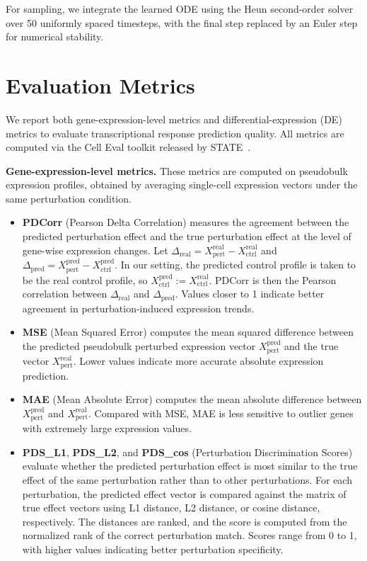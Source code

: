 \documentclass[11pt]{article}
\begin{document}
For sampling, we integrate the learned ODE using the Heun second-order solver over 50 uniformly spaced timesteps, with the final step replaced by an Euler step for numerical stability. 



\section{Evaluation Metrics}
\label{app:evaluation_metrics}

We report both gene-expression-level metrics and differential-expression (DE) metrics to evaluate transcriptional response prediction quality. All metrics are computed via the Cell Eval toolkit released by STATE~\cite{arcinstitute2026celleval}.

\textbf{Gene-expression-level metrics.} These metrics are computed on pseudobulk expression profiles, obtained by averaging single-cell expression vectors under the same perturbation condition.

\begin{itemize}
  \item \textbf{PDCorr} (Pearson Delta Correlation) measures the agreement between the predicted perturbation effect and the true perturbation effect at the level of gene-wise expression changes. Let $\Delta_{\mathrm{real}} = X^{\mathrm{real}}_{\mathrm{pert}} - X^{\mathrm{real}}_{\mathrm{ctrl}}$ and $\Delta_{\mathrm{pred}} = X^{\mathrm{pred}}_{\mathrm{pert}} - X^{\mathrm{pred}}_{\mathrm{ctrl}}$. In our setting, the predicted control profile is taken to be the real control profile, so $X^{\mathrm{pred}}_{\mathrm{ctrl}} := X^{\mathrm{real}}_{\mathrm{ctrl}}$. PDCorr is then the Pearson correlation between $\Delta_{\mathrm{real}}$ and $\Delta_{\mathrm{pred}}$. Values closer to 1 indicate better agreement in perturbation-induced expression trends.
  \item \textbf{MSE} (Mean Squared Error) computes the mean squared difference between the predicted pseudobulk perturbed expression vector $X^{\mathrm{pred}}_{\mathrm{pert}}$ and the true vector $X^{\mathrm{real}}_{\mathrm{pert}}$. Lower values indicate more accurate absolute expression prediction.
  \item \textbf{MAE} (Mean Absolute Error) computes the mean absolute difference between $X^{\mathrm{pred}}_{\mathrm{pert}}$ and $X^{\mathrm{real}}_{\mathrm{pert}}$. Compared with MSE, MAE is less sensitive to outlier genes with extremely large expression values.
  \item \textbf{PDS\_L1}, \textbf{PDS\_L2}, and \textbf{PDS\_cos} (Perturbation Discrimination Scores) evaluate whether the predicted perturbation effect is most similar to the true effect of the same perturbation rather than to other perturbations. For each perturbation, the predicted effect vector is compared against the matrix of true effect vectors using L1 distance, L2 distance, or cosine distance, respectively. The distances are ranked, and the score is computed from the normalized rank of the correct perturbation match. Scores range from 0 to 1, with higher values indicating better perturbation specificity.
\end{itemize}
\end{document}
